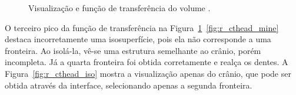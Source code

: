 \begin{figure}[h]
	\centering
	\caption{Visualização e função de transferência do volume .}
	\label{fig:r_cthead}
\end{figure}

	O terceiro pico da função de transferência na Figura~\ref{fig:r_cthead}~\ref{fig:r_cthead_mine} destaca incorretamente uma isosuperfície, pois ela não corresponde a uma fronteira. Ao isolá-la, vê-se uma estrutura semelhante ao crânio, porém incompleta. Já a quarta fronteira foi obtida corretamente e realça os dentes. A Figura~\ref{fig:r_cthead_iso} mostra a visualização apenas do crânio, que pode ser obtida através da interface, selecionando apenas a segunda fronteira.

